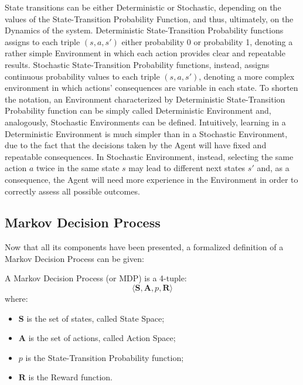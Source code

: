             State transitions can be either Deterministic or Stochastic, depending on the values of the State-Transition Probability Function, and thus, ultimately, on the Dynamics of the system. Deterministic State-Transition Probability functions assigns to each triple $(s, a, s')$ either probability 0 or probability 1, denoting a rather simple Environment in which each action provides clear and repeatable results. Stochastic State-Transition Probability functions, instead, assigns continuous probability values to each triple $(s, a, s')$, denoting a more complex environment in which actions' consequences are variable in each state. \newline
            To shorten the notation, an Environment characterized by Deterministic State-Transition Probability function can be simply called Deterministic Environment and, analogously, Stochastic Environments can be defined. \newline
            Intuitively, learning in a Deterministic Environment is much simpler than in a Stochastic Environment, due to the fact that the decisions taken by the Agent will have fixed and repeatable consequences. In Stochastic Environment, instead, selecting the same action $a$ twice in the same state $s$ may lead to different next states $s'$ and, as a consequence, the Agent will need more experience in the Environment in order to correctly assess all possible outcomes.
            
        \subsection{Markov Decision Process}
            Now that all its components have been presented, a formalized definition of a Markov Decision Process can be given:
            
            \begin{definition}
                \label{def:mdp}
                A Markov Decision Process (or MDP) is a 4-tuple:
                \[ \langle \mathbf{S}, \mathbf{A}, p, \mathbf{R} \rangle\]
                where:
                \begin{itemize}
                    \setlength\itemsep{0em}
                    \item $\mathbf{S}$ is the set of states, called State Space;
                    \item $\mathbf{A}$ is the set of actions, called Action Space;
                    \item $p$ is the State-Transition Probability function;
                    \item $\mathbf{R}$ is the Reward function.
                \end{itemize}
            \end{definition}
            
